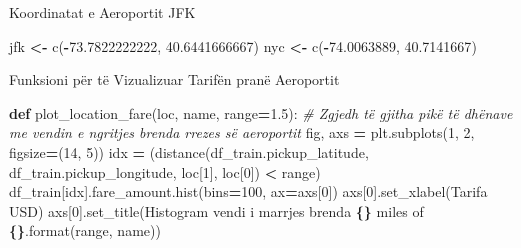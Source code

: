 \documentclass[
  ignorenonframetext,
]{beamer}
\newenvironment{Shaded}{\begin{snugshade}}{\end{snugshade}}
\newcommand{\BuiltInTok}[1]{#1}
\newcommand{\CommentTok}[1]{\textcolor[rgb]{0.56,0.35,0.01}{\textit{#1}}}
\newcommand{\DecValTok}[1]{\textcolor[rgb]{0.00,0.00,0.81}{#1}}
\newcommand{\FloatTok}[1]{\textcolor[rgb]{0.00,0.00,0.81}{#1}}
\newcommand{\KeywordTok}[1]{\textcolor[rgb]{0.13,0.29,0.53}{\textbf{#1}}}
\newcommand{\NormalTok}[1]{#1}
\newcommand{\OperatorTok}[1]{\textcolor[rgb]{0.81,0.36,0.00}{\textbf{#1}}}
\newcommand{\SpecialCharTok}[1]{\textcolor[rgb]{0.81,0.36,0.00}{\textbf{#1}}}
\newcommand{\StringTok}[1]{\textcolor[rgb]{0.31,0.60,0.02}{#1}}
\begin{document}
\begin{frame}[fragile]{Koordinatat e Aeroportit JFK}
\protect\hypertarget{koordinatat-e-aeroportit-jfk}{}

\begin{Shaded}
\begin{Highlighting}[]
\NormalTok{jfk }\OperatorTok{\textless{}{-}}\NormalTok{ c(}\OperatorTok{{-}}\FloatTok{73.7822222222}\NormalTok{, }\FloatTok{40.6441666667}\NormalTok{)}
\NormalTok{nyc }\OperatorTok{\textless{}{-}}\NormalTok{ c(}\OperatorTok{{-}}\FloatTok{74.0063889}\NormalTok{, }\FloatTok{40.7141667}\NormalTok{)}
\end{Highlighting}
\end{Shaded}
\end{frame}

\begin{frame}[fragile]{Funksioni për të Vizualizuar Tarifën pranë
Aeroportit}
\protect\hypertarget{funksioni-puxebr-tuxeb-vizualizuar-tarifuxebn-pranuxeb-aeroportit}{}

\begin{Shaded}
\begin{Highlighting}[]
\KeywordTok{def}\NormalTok{ plot\_location\_fare(loc, name, }\BuiltInTok{range}\OperatorTok{=}\FloatTok{1.5}\NormalTok{):}
     \CommentTok{\# Zgjedh të gjitha pikë të dhënave me vendin e ngritjes brenda rrezes së aeroportit}
\NormalTok{    fig, axs }\OperatorTok{=}\NormalTok{ plt.subplots(}\DecValTok{1}\NormalTok{, }\DecValTok{2}\NormalTok{, figsize}\OperatorTok{=}\NormalTok{(}\DecValTok{14}\NormalTok{, }\DecValTok{5}\NormalTok{))}
\NormalTok{    idx }\OperatorTok{=}\NormalTok{ (distance(df\_train.pickup\_latitude, df\_train.pickup\_longitude, loc[}\DecValTok{1}\NormalTok{], loc[}\DecValTok{0}\NormalTok{]) }\OperatorTok{\textless{}} \BuiltInTok{range}\NormalTok{)}
\NormalTok{    df\_train[idx].fare\_amount.hist(bins}\OperatorTok{=}\DecValTok{100}\NormalTok{, ax}\OperatorTok{=}\NormalTok{axs[}\DecValTok{0}\NormalTok{])}
\NormalTok{    axs[}\DecValTok{0}\NormalTok{].set\_xlabel(}\StringTok{\textquotesingle{}Tarifa USD\textquotesingle{}}\NormalTok{)}
\NormalTok{    axs[}\DecValTok{0}\NormalTok{].set\_title(}\StringTok{\textquotesingle{}Histogram vendi i marrjes brenda }\SpecialCharTok{\{\}}\StringTok{ miles of }\SpecialCharTok{\{\}}\StringTok{\textquotesingle{}}\NormalTok{.}\BuiltInTok{format}\NormalTok{(}\BuiltInTok{range}\NormalTok{, name))}


\end{Highlighting}
\end{Shaded}
\end{frame}
\end{document}

